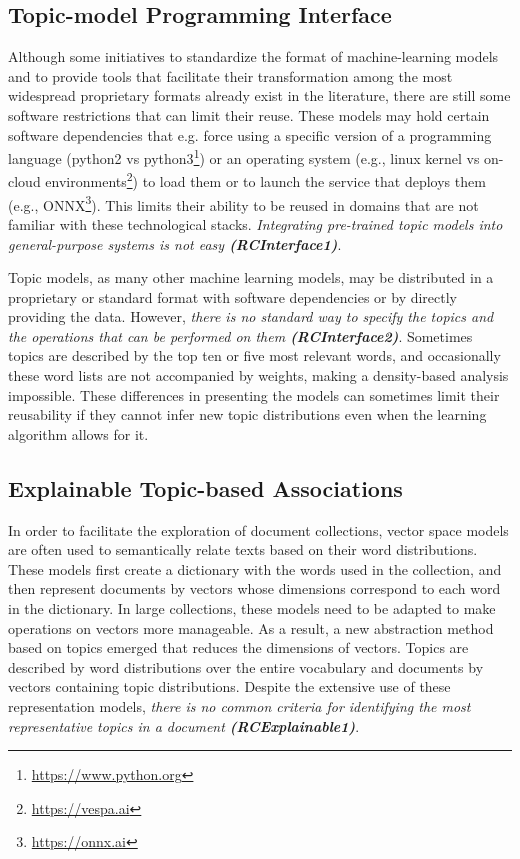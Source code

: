 \subsection{Topic-model Programming Interface}

Although some initiatives to standardize the format of machine-learning models and to provide tools that facilitate their transformation among the most widespread proprietary formats already exist in the literature, there are still some software restrictions that can limit their reuse. These models may hold certain software dependencies that e.g. force using a specific version of a programming language (python2 vs python3\footnote{\url{https://www.python.org}}) or an operating system (e.g., linux kernel vs on-cloud environments\footnote{\url{https://vespa.ai}}) to load them or to launch the service that deploys them (e.g., ONNX\footnote{\url{https://onnx.ai}}). This limits their ability to be reused in domains that are not familiar with these technological stacks. \textit{Integrating pre-trained topic models into general-purpose systems is not easy \textbf{(RCInterface1)}}.


Topic models, as many other machine learning models, may be distributed in a proprietary or standard format with software dependencies or by directly providing the data. However, \textit{there is no standard way to specify the topics and the operations that can be performed on them \textbf{(RCInterface2)}}. Sometimes topics are described by the top ten or five most relevant words, and occasionally these word lists are not accompanied by weights, making a density-based analysis impossible. These differences in presenting the models can sometimes limit their reusability if they cannot infer new topic distributions even when the learning algorithm allows for it.


\subsection{Explainable Topic-based Associations}

In order to facilitate the exploration of document collections, vector space models are often used to semantically relate texts based on their word distributions. These models first create a dictionary with the words used in the collection, and then represent  documents by vectors whose dimensions correspond to each word in the dictionary. In large collections, these models need to be adapted to make operations on vectors more manageable. As a result, a new abstraction method based on topics emerged that reduces the dimensions of vectors. Topics are described by word distributions over the entire vocabulary and documents by vectors containing topic distributions. Despite the extensive use of these representation models, \textit{there is no common criteria for identifying the most representative topics in a document \textbf{(RCExplainable1)}}. 


